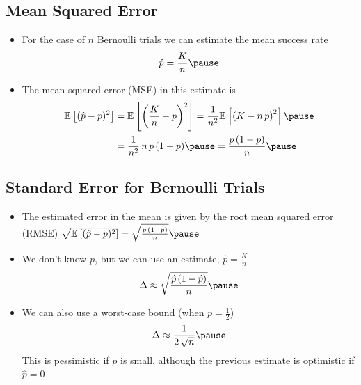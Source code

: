 
\begin{slide}
\section[-2]{Mean Squared Error}
  
\begin{PauseHighLight}
  \begin{itemize}
  \item For the case of $n$ Bernoulli trials we can estimate the mean
    success rate
    \begin{align*}
      \hat{p} = \frac{K}{n}\pause
    \end{align*}
  \item The mean squared error (MSE) in this estimate is
    \begin{align*}
      \av{(\hat{p}-p)^2} &= \av{\bra{\frac{K}{n}-p}^2} = \frac{1}{n^2}
                 \av{\bra{K-n\,p}^2} \pause\\
      &= \frac{1}{n^2}\,n\,p\,(1-p)\pause = \frac{p\,(1-p)}{n}\pause
    \end{align*}
  \end{itemize}
\end{PauseHighLight}

\end{slide}


\begin{slide}
\section[-2]{Standard Error for Bernoulli Trials}

\begin{PauseHighLight}
  \begin{itemize}
  \item The estimated error in the mean is given by the root mean
    squared error (RMSE) $\sqrt{\av{(\hat{p}-p)^2}} = \sqrt{\frac{p\,(1-p)}{n}}\pause$
  \item We don't know $p$, but we can use an estimate, $\hat{p}=\frac{K}{n}$
    \begin{align*}
      \Delta \approx \sqrt{\frac{\hat{p}\,(1-\hat{p})}{n}}\pause
    \end{align*}
  \item We can also use a worst-case bound (when $p=\frac{1}{2}$)
    \begin{align*}
      \Delta \approx \frac{1}{2\,\sqrt{n}}\pause
    \end{align*}
    This is pessimistic if $p$ is small, although the previous
    estimate is optimistic if $\hat{p}=0$\pause 
  \end{itemize}
\end{PauseHighLight}

\end{slide}


